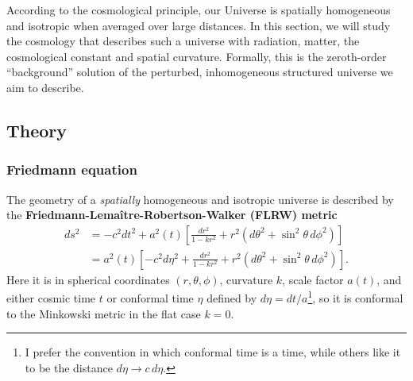\documentclass[10pt,a4paper]{article}
\begin{document}
According to the cosmological principle,
our Universe is spatially homogeneous and isotropic when averaged over large distances.
In this section, we will study the cosmology that describes such a universe
with radiation, matter, the cosmological constant and spatial curvature.
Formally, this is the zeroth-order ``background'' solution of the perturbed, inhomogeneous structured universe we aim to describe.

\subsection{Theory}
\label{sec_background_cosmology_theory}

\subsubsection{Friedmann equation}

The geometry of a \emph{spatially} homogeneous and isotropic universe
is described by the \textbf{Friedmann-Lemaître-Robertson-Walker (FLRW) metric}
\begin{equation}
\begin{split}
	ds^2 &= -c^2 dt^2 + a^2(t) \left[\frac{dr^2}{1 - kr^2} + r^2\left(d\theta^2 + \sin^2\theta \, d\phi^2\right) \right] \\
	     &= a^2(t) \left[-c^2 d\eta^2 + \frac{dr^2}{1 - kr^2} + r^2\left(d\theta^2 + \sin^2\theta \, d\phi^2\right) \right].
\end{split}
\label{eq_flrw}
\end{equation}
Here it is in spherical coordinates $(r,\theta,\phi)$, curvature $k$, scale factor $a(t)$,
and either cosmic time $t$ or conformal time $\eta$ defined by $d\eta = dt/a$\footnote{I prefer the convention in which conformal time is a time, while others like it to be the distance $d\eta \rightarrow c \, d\eta$.},
so it is conformal to the Minkowski metric in the flat case $k=0$.
\end{document}

